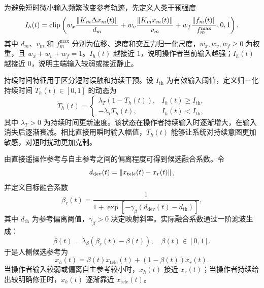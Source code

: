 为避免短时微小输入频繁改变参考轨迹，先定义人类干预强度
\begin{equation}
  I_h(t)=
  \operatorname{clip}\left(
  w_x\frac{\left\lVert K_m\Delta x_m(t)\right\rVert}{d_m}
  +w_v\frac{\left\lVert K_m\dot x_m(t)\right\rVert}{v_m}
  +w_f\frac{\left\lVert f_m(t)\right\rVert}{f_m^{\max}},
  0,1
  \right),
  \label{eq:ch4_intensity}
\end{equation}
其中 $d_m$、$v_m$ 和 $f_m^{\max}$ 分别为位移、速度和交互力归一化尺度，$w_x,w_v,w_f\ge0$ 为权重，且 $w_x+w_v+w_f=1$。$I_h(t)$ 越接近 $1$，说明操作者当前输入越强；$I_h(t)$ 越接近 $0$，说明主端输入较弱或接近静止。

持续时间特征用于区分短时误触和持续干预。设 $I_{\mathrm{th}}$ 为有效输入阈值，定义归一化持续时间 $T_h(t)\in[0,1]$ 的动态为
\begin{equation}
  \dot T_h(t)=
  \begin{cases}
    \lambda_T\left(1-T_h(t)\right), & I_h(t)\ge I_{\mathrm{th}},\\
    -\lambda_T T_h(t), & I_h(t)<I_{\mathrm{th}},
  \end{cases}
  \label{eq:ch4_duration}
\end{equation}
其中 $\lambda_T>0$ 为持续时间更新速度。该状态在操作者持续输入时逐渐增大，在输入消失后逐渐衰减。相比直接用瞬时输入幅值，$T_h(t)$ 能够让系统对持续意图更加敏感，对短时扰动更加克制。

由直接遥操作参考与自主参考之间的偏离程度可得到候选融合系数。令
\begin{equation}
  d_{\mathrm{dev}}(t)=\left\lVert x_{\mathrm{tele}}(t)-x_r(t)\right\rVert,
  \label{eq:ch4_dev_distance}
\end{equation}
并定义目标融合系数
\begin{equation}
  \beta_r(t)=
  \frac{1}{1+\exp[-\gamma_{\beta}(d_{\mathrm{dev}}(t)-d_{\mathrm{th}})]},
  \label{eq:ch4_beta_target}
\end{equation}
其中 $d_{\mathrm{th}}$ 为参考偏离阈值，$\gamma_{\beta}>0$ 决定映射斜率。实际融合系数通过一阶滤波生成：
\begin{equation}
  \dot\beta(t)=\lambda_{\beta}\left(\beta_r(t)-\beta(t)\right),
  \quad \beta(t)\in[0,1].
  \label{eq:ch4_beta_filter}
\end{equation}
于是人侧候选参考为
\begin{equation}
  x_h(t)=\beta(t)x_{\mathrm{tele}}(t)+\left(1-\beta(t)\right)x_r(t).
  \label{eq:ch4_human_candidate}
\end{equation}
当操作者输入较弱或偏离自主参考较小时，$x_h(t)$ 接近 $x_r(t)$；当操作者持续给出较明确修正时，$x_h(t)$ 逐渐靠近 $x_{\mathrm{tele}}(t)$。

